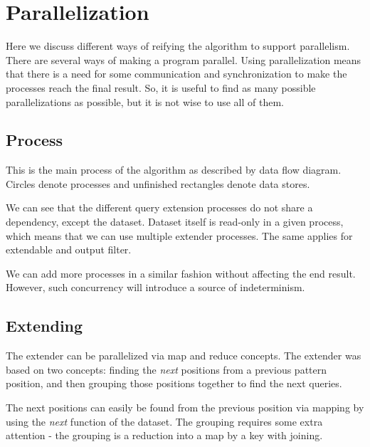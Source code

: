 \chapter{Parallelization}
\label{c:parallelization}

Here we discuss different ways of reifying the algorithm to support parallelism. There are several ways of making a program parallel. Using parallelization means that there is a need for some communication and synchronization to make the processes reach the final result. So, it is useful to find as many possible parallelizations as possible, but it is not wise to use all of them.

\section{Process}

This is the main process of the algorithm as described by data flow diagram.\cite{Kahn74,Lee95} Circles denote processes and unfinished rectangles denote data stores.

\begin{figure}[H]
	\scalebox{0.8}{}
\end{figure}

We can see that the different query extension processes do not share a dependency, except the dataset. Dataset itself is read-only in a given process, which means that we can use multiple extender processes. The same applies for extendable and output filter.

\begin{figure}[H]
  \scalebox{0.8}{}
\end{figure}

We can add more processes in a similar fashion without affecting the end result. However, such concurrency will introduce a source of indeterminism.

\section{Extending}

The extender can be parallelized via map and reduce concepts\cite{MapReduce,SteeleFold}. The extender was based on two concepts: finding the \emph{next} positions from a previous pattern position, and then grouping those positions together to find the next queries.

The next positions can easily be found from the previous position via mapping by using the \emph{next} function of the dataset. The grouping requires some extra attention - the grouping is a reduction into a map by a key with joining.

